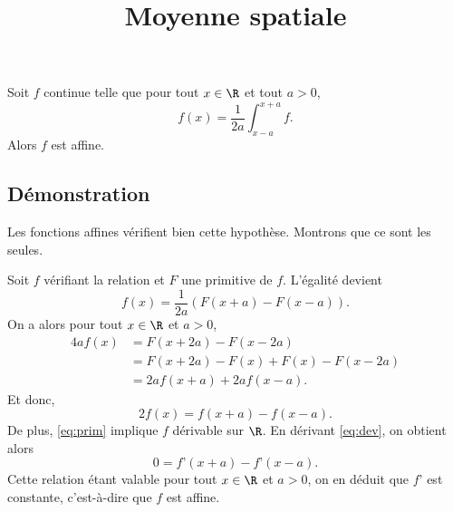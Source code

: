 \documentclass[fontsize=12pt,twoside=false,parskip=half, french]{scrartcl}
\title{Moyenne spatiale}
\date{}
\author{}
\begin{document}
\maketitle
   \begin{Theoreme}
      Soit $f$ continue telle que pour tout $x \in \R$ et tout $a > 0$,
      \[
         f(x) = \frac{1}{2a}\int_{x - a}^{x + a} f.
      \]
      Alors $f$ est affine.
   \end{Theoreme}
   \subsection{Démonstration}
      Les fonctions affines vérifient bien cette hypothèse. Montrons que ce sont les seules.
      
      Soit $f$ vérifiant la relation et $F$ une primitive de $f$. L’égalité devient
      \begin{equation}
         f(x) = \frac{1}{2a} (F(x + a) - F(x - a)). \label{eq:prim}
      \end{equation}
      On a alors pour tout $x \in \R$ et $a > 0$,
      \begin{align*}
         4af(x) &= F(x + 2a) - F(x - 2a)\\
                &= F(x + 2a) - F(x) + F(x) - F(x - 2a)\\
                &= 2af(x + a) + 2af(x - a).
      \end{align*}
      Et donc,
      \begin{equation}
         2f(x) = f(x + a) - f(x - a). \label{eq:dev}
      \end{equation}
      De plus, \eqref{eq:prim} implique $f$ dérivable sur $\R$. En dérivant \eqref{eq:dev}, on obtient alors
     \[
         0 = f’(x + a) - f’(x - a).
     \]
     Cette relation étant valable pour tout $x \in \R$ et $a > 0$, on en déduit que $f’$ est constante,
     c’est-à-dire que $f$ est affine.
\end{document}
